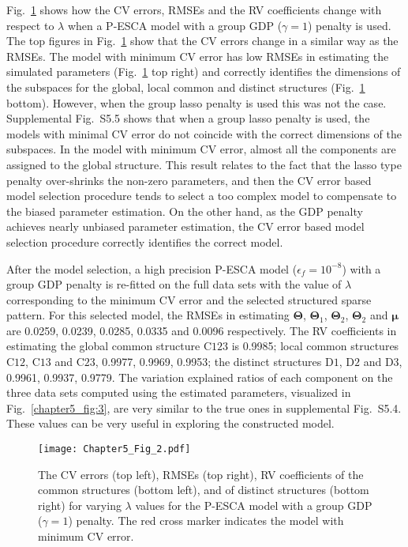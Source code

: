 Fig.~\ref{chapter5_fig:2} shows how the CV errors, RMSEs and the RV coefficients change with respect to $\lambda$ when a P-ESCA model with a group GDP ($\gamma=1$) penalty is used. The top figures in Fig.~\ref{chapter5_fig:2} show that the CV errors change in a similar way as the RMSEs. The model with minimum CV error has low RMSEs in estimating the simulated parameters (Fig.~\ref{chapter5_fig:2} top right) and correctly identifies the dimensions of the subspaces for the global, local common and distinct structures (Fig.~\ref{chapter5_fig:2} bottom). However, when the group lasso penalty is used this was not the case. Supplemental Fig.~S5.5 shows that when a group lasso penalty is used, the models with minimal CV error do not coincide with the correct dimensions of the subspaces. In the model with minimum CV error, almost all the components are assigned to the global structure. This result relates to the fact that the lasso type penalty over-shrinks the non-zero parameters, and then the CV error based model selection procedure tends to select a too complex model to compensate to the biased parameter estimation. On the other hand, as the GDP penalty achieves nearly unbiased parameter estimation, the CV error based model selection procedure correctly identifies the correct model.

After the model selection, a high precision P-ESCA model ($\epsilon_{f} = 10^{-8}$) with a group GDP penalty is re-fitted on the full data sets with the value of $\lambda$ corresponding to the minimum CV error and the selected structured sparse pattern. For this selected model, the RMSEs in estimating $\mathbf{\Theta}$, $\mathbf{\Theta}_1$, $\mathbf{\Theta}_2$, $\mathbf{\Theta}_2$ and $\bm{\mu}$ are 0.0259, 0.0239, 0.0285, 0.0335 and 0.0096 respectively. The RV coefficients in estimating the global common structure $\text{C123}$ is 0.9985; local common structures $\text{C12}$, $\text{C13}$ and $\text{C23}$, 0.9977, 0.9969, 0.9953; the distinct structures $\text{D1}$, $\text{D2}$ and $\text{D3}$, 0.9961, 0.9937, 0.9779. The variation explained ratios of each component on the three data sets computed using the estimated parameters, visualized in Fig.~\ref{chapter5_fig:3}, are very similar to the true ones in supplemental Fig.~S5.4. These values can be very useful in exploring the constructed model.

\begin{figure}[h]
    \center
    \texttt{[image: Chapter5\_Fig\_2.pdf]}
    \caption{The CV errors (top left), RMSEs (top right), RV coefficients of the common structures (bottom left), and of distinct structures (bottom right) for varying $\lambda$ values for the P-ESCA model with a group GDP ($\gamma = 1$) penalty. The red cross marker indicates the model with minimum CV error.}
	\label{chapter5_fig:2}
\end{figure}

